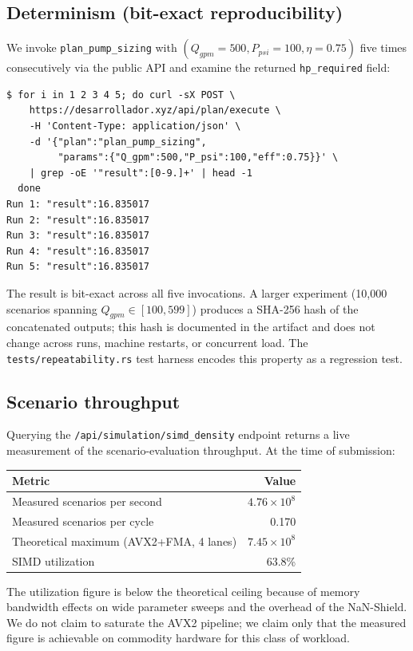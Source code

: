 \documentclass[11pt,a4paper]{article}
\begin{document}
\subsection{Determinism (bit-exact reproducibility)}

We invoke \texttt{plan\_pump\_sizing} with $(Q_{gpm}=500, P_{psi}=100, \eta=0.75)$ five times consecutively via the public API and examine the returned \texttt{hp\_required} field:

\begin{lstlisting}
$ for i in 1 2 3 4 5; do curl -sX POST \
    https://desarrollador.xyz/api/plan/execute \
    -H 'Content-Type: application/json' \
    -d '{"plan":"plan_pump_sizing",
         "params":{"Q_gpm":500,"P_psi":100,"eff":0.75}}' \
    | grep -oE '"result":[0-9.]+' | head -1
  done
Run 1: "result":16.835017
Run 2: "result":16.835017
Run 3: "result":16.835017
Run 4: "result":16.835017
Run 5: "result":16.835017
\end{lstlisting}

The result is bit-exact across all five invocations. A larger experiment (10{,}000 scenarios spanning $Q_{gpm} \in [100, 599]$) produces a SHA-256 hash of the concatenated outputs; this hash is documented in the artifact and does not change across runs, machine restarts, or concurrent load. The \texttt{tests/repeatability.rs} test harness encodes this property as a regression test.

\subsection{Scenario throughput}

Querying the \texttt{/api/simulation/simd\_density} endpoint returns a live measurement of the scenario-evaluation throughput. At the time of submission:

\begin{center}
\begin{tabular}{lr}
\toprule
Metric & Value \\
\midrule
Measured scenarios per second & $4.76 \times 10^{8}$ \\
Measured scenarios per cycle & 0.170 \\
Theoretical maximum (AVX2+FMA, 4 lanes) & $7.45 \times 10^{8}$ \\
SIMD utilization & 63.8\% \\
\bottomrule
\end{tabular}
\end{center}

The utilization figure is below the theoretical ceiling because of memory bandwidth effects on wide parameter sweeps and the overhead of the NaN-Shield. We do not claim to saturate the AVX2 pipeline; we claim only that the measured figure is achievable on commodity hardware for this class of workload.
\end{document}
